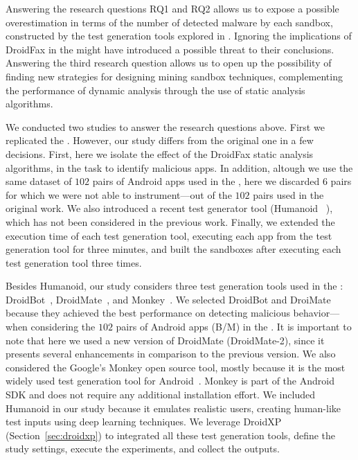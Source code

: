 
Answering the research questions RQ1 and RQ2 allows us to expose a possible overestimation in terms of the number of detected malware by each sandbox, constructed by the test
generation tools explored in \blls. Ignoring the implications of DroidFax in the \blls might have introduced a possible threat to their conclusions. Answering the third research question
allows us to open up the possibility of finding new strategies for designing mining sandbox techniques, complementing the performance of
dynamic analysis through the use of static analysis algorithms.

We conducted two studies to answer the research questions above. First we replicated the \blls. However, our study differs from the original one in a few decisions. First, here we isolate
the effect of the DroidFax static analysis algorithms, in the task to identify malicious apps. In addition, altough we use the same dataset of
$102$ pairs of Android apps used in the \blls, here we discarded $6$ pairs for which
we were not able to instrument---out of the $102$ pairs used in the original work. We also introduced a recent test generator tool (Humanoid ~\cite{DBLP:conf/kbse/LiY0C19}), which
has not been considered in the previous work. Finally, we extended the execution time of each test generation tool, executing each app from the test generation tool for three minutes,
and built the sandboxes after executing each test generation tool three times. %

Besides Humanoid, our study considers three test generation tools used in the \blls: DroidBot~\cite{DBLP:conf/icse/LiYGC17},
DroidMate~\cite{DBLP:conf/icse/JamrozikZ16}, and Monkey~\cite{Monkey}. We selected DroidBot and DroiMate because they achieved
the best performance on detecting malicious behavior---when considering the $102$ pairs of Android apps (B/M) in the \blls.
It is important to note that here we used a new version of DroidMate (DroidMate-2), since it presents several enhancements
in comparison to the previous version. We also considered the Google's Monkey open source tool, mostly because it is the most
widely used test generation tool for Android~\cite{DBLP:conf/sigsoft/ZengLZXDLYX16}. Monkey is part of the Android SDK
and does not require any additional installation effort. We included Humanoid in our study
because it emulates realistic users, creating human-like test inputs using deep learning techniques.
We leverage DroidXP~\cite{DBLP:conf/scam/CostaMCMVBC20} (Section~\ref{sec:droidxp}) to integrated all these test generation tools,
define the study settings, execute the
experiments, and collect the outputs.

